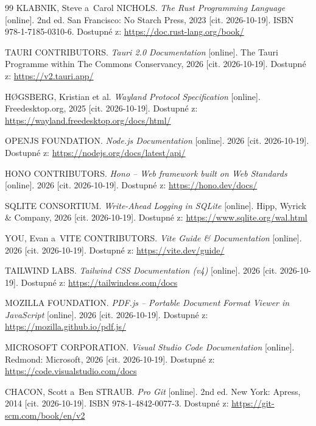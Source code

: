 \documentclass[12pt, a4paper, oneside]{article}
\begin{document}
\begin{thebibliography}{99}
    KLABNIK, Steve a~Carol NICHOLS. \textit{The Rust Programming Language} [online]. 2nd ed. San Francisco: No Starch Press, 2023 [cit. 2026-10-19]. ISBN 978-1-7185-0310-6. Dostupné z: \url{https://doc.rust-lang.org/book/}

    TAURI CONTRIBUTORS. \textit{Tauri 2.0 Documentation} [online]. The Tauri Programme within The Commons Conservancy, 2026 [cit. 2026-10-19]. Dostupné z: \url{https://v2.tauri.app/}

    HØGSBERG, Kristian et al. \textit{Wayland Protocol Specification} [online]. Freedesktop.org, 2025 [cit. 2026-10-19]. Dostupné z: \url{https://wayland.freedesktop.org/docs/html/}

    OPENJS FOUNDATION. \textit{Node.js Documentation} [online]. 2026 [cit. 2026-10-19]. Dostupné z: \url{https://nodejs.org/docs/latest/api/}

    HONO CONTRIBUTORS. \textit{Hono -- Web framework built on Web Standards} [online]. 2026 [cit. 2026-10-19]. Dostupné z: \url{https://hono.dev/docs/}

    SQLITE CONSORTIUM. \textit{Write-Ahead Logging in SQLite} [online]. Hipp, Wyrick \& Company, 2026 [cit. 2026-10-19]. Dostupné z: \url{https://www.sqlite.org/wal.html}

    YOU, Evan a~VITE CONTRIBUTORS. \textit{Vite Guide \& Documentation} [online]. 2026 [cit. 2026-10-19]. Dostupné z: \url{https://vite.dev/guide/}

    TAILWIND LABS. \textit{Tailwind CSS Documentation (v4)} [online]. 2026 [cit. 2026-10-19]. Dostupné z: \url{https://tailwindcss.com/docs}

    MOZILLA FOUNDATION. \textit{PDF.js -- Portable Document Format Viewer in JavaScript} [online]. 2026 [cit. 2026-10-19]. Dostupné z: \url{https://mozilla.github.io/pdf.js/}

    MICROSOFT CORPORATION. \textit{Visual Studio Code Documentation} [online]. Redmond: Microsoft, 2026 [cit. 2026-10-19]. Dostupné z: \url{https://code.visualstudio.com/docs}

    CHACON, Scott a~Ben STRAUB. \textit{Pro Git} [online]. 2nd ed. New York: Apress, 2014 [cit. 2026-10-19]. ISBN 978-1-4842-0077-3. Dostupné z: \url{https://git-scm.com/book/en/v2}

\end{thebibliography}
\endgroup
\end{document}
